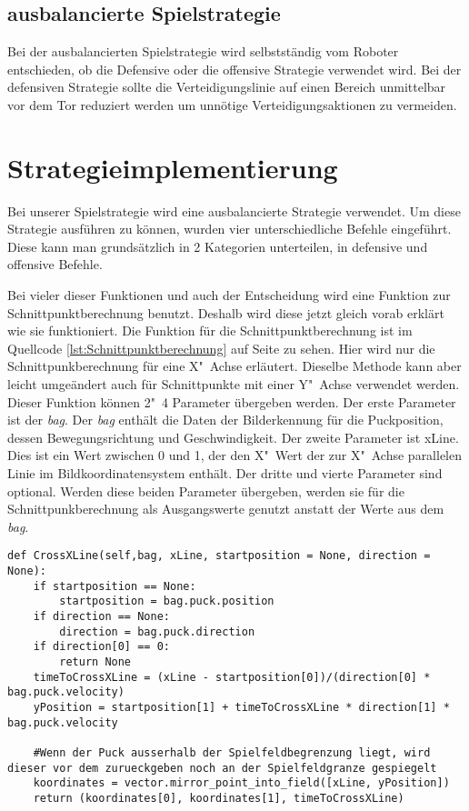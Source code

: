\subsection{ausbalancierte Spielstrategie}
Bei der ausbalancierten Spielstrategie wird selbstständig vom Roboter entschieden, ob die Defensive oder die offensive Strategie verwendet wird. Bei der defensiven Strategie sollte die Verteidigungslinie auf einen Bereich unmittelbar vor dem Tor reduziert werden um unnötige Verteidigungsaktionen zu vermeiden.

\section{Strategieimplementierung}

Bei unserer Spielstrategie wird eine ausbalancierte Strategie verwendet. Um diese Strategie ausführen zu können, wurden vier unterschiedliche Befehle eingeführt. Diese kann man grundsätzlich in 2 Kategorien unterteilen, in defensive und offensive Befehle. 

Bei vieler dieser Funktionen und auch der Entscheidung wird eine Funktion zur Schnittpunktberechnung benutzt. Deshalb wird diese jetzt gleich vorab erklärt wie sie funktioniert. Die Funktion für die Schnittpunktberechnung ist  im Quellcode \ref{lst:Schnittpunktberechnung} auf Seite \pageref{lst:Schnittpunktberechnung} zu sehen. Hier wird nur die Schnittpunkberechnung für eine X"~Achse erläutert. Dieselbe Methode kann aber leicht umgeändert auch für Schnittpunkte mit einer Y"~Achse verwendet werden. Dieser Funktion können 2"~4 Parameter übergeben werden. Der erste Parameter ist der \textit{bag}. Der \textit{bag} enthält die Daten der Bilderkennung für die Puckposition, dessen Bewegungsrichtung und Geschwindigkeit. Der zweite Parameter ist xLine. Dies ist ein Wert zwischen 0 und 1, der den X"~Wert der zur X"~Achse parallelen Linie im Bildkoordinatensystem enthält. Der dritte und vierte Parameter sind optional. Werden diese beiden Parameter übergeben, werden sie für die Schnittpunkberechnung als Ausgangswerte genutzt anstatt der Werte aus dem \textit{bag}.

\begin{lstlisting}[caption= Python-Funktion für Schnittpunktberechnung, label=lst:Schnittpunktberechnung]
def CrossXLine(self,bag, xLine, startposition = None, direction = None):     
	if startposition == None:
		startposition = bag.puck.position
	if direction == None:
		direction = bag.puck.direction
	if direction[0] == 0:
		return None
	timeToCrossXLine = (xLine - startposition[0])/(direction[0] * bag.puck.velocity)
	yPosition = startposition[1] + timeToCrossXLine * direction[1] * bag.puck.velocity
	
	#Wenn der Puck ausserhalb der Spielfeldbegrenzung liegt, wird dieser vor dem zurueckgeben noch an der Spielfeldgranze gespiegelt
	koordinates = vector.mirror_point_into_field([xLine, yPosition])
	return (koordinates[0], koordinates[1], timeToCrossXLine)
\end{lstlisting}


